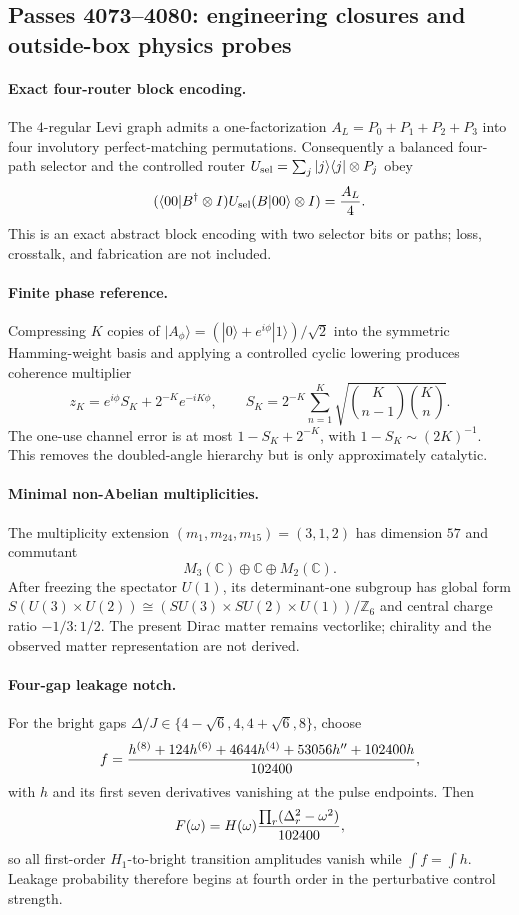 \subsection{Passes 4073--4080: engineering closures and outside-box physics probes}
\label{sec:pass4073-4080}

\paragraph{Exact four-router block encoding.}
The $4$-regular Levi graph admits a one-factorization
$A_L=P_0+P_1+P_2+P_3$ into four involutory perfect-matching
permutations.  Consequently a balanced four-path selector and the
controlled router $U_{\rm sel}=\sum_j |j\rangle\langle j|\otimes P_j$
obey
\[
 (\langle 00|B^\dagger\otimes I)U_{\rm sel}(B|00\rangle\otimes I)
 ={A_L\over4}.
\]
This is an exact abstract block encoding with two selector bits or paths;
loss, crosstalk, and fabrication are not included.

\paragraph{Finite phase reference.}
Compressing $K$ copies of
$|A_\phi\rangle=(|0\rangle+e^{i\phi}|1\rangle)/\sqrt2$ into the symmetric
Hamming-weight basis and applying a controlled cyclic lowering produces
coherence multiplier
\[
 z_K=e^{i\phi}S_K+2^{-K}e^{-iK\phi},\qquad
 S_K=2^{-K}\sum_{n=1}^K\sqrt{\binom K{n-1}\binom Kn}.
\]
The one-use channel error is at most $1-S_K+2^{-K}$, with
$1-S_K\sim(2K)^{-1}$.  This removes the doubled-angle hierarchy but is
only approximately catalytic.

\paragraph{Minimal non-Abelian multiplicities.}
The multiplicity extension
$(m_1,m_{24},m_{15})=(3,1,2)$ has dimension $57$ and commutant
\[
 M_3(\mathbb C)\oplus\mathbb C\oplus M_2(\mathbb C).
\]
After freezing the spectator $U(1)$, its determinant-one subgroup has
global form $S(U(3)\times U(2))\cong
(SU(3)\times SU(2)\times U(1))/\mathbb Z_6$ and central charge ratio
$-1/3:1/2$.  The present Dirac matter remains vectorlike; chirality and
the observed matter representation are not derived.

\paragraph{Four-gap leakage notch.}
For the bright gaps
$\Delta/J\in\{4-\sqrt6,4,4+\sqrt6,8\}$, choose
\[
 f={h^{(8)}+124h^{(6)}+4644h^{(4)}+53056h''+102400h\over102400},
\]
with $h$ and its first seven derivatives vanishing at the pulse
endpoints.  Then
\[
 F(\omega)=H(\omega){\prod_r(\Delta_r^2-\omega^2)\over102400},
\]
so all first-order $H_1$-to-bright transition amplitudes vanish while
$\int f=\int h$.  Leakage probability therefore begins at fourth order
in the perturbative control strength.

